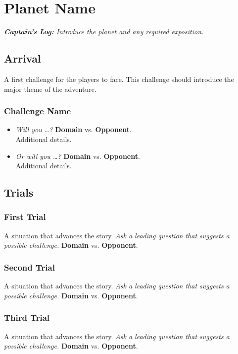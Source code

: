 \documentclass[11pt, a5paper, parskip=half-, DIV=12]{scrartcl}
\begin{document}
\section*{Planet Name}
\textit{\textbf{Captain's Log:} Introduce the planet and any required exposition.}

\subsection*{Arrival}
A first challenge for the players to face.  This challenge should introduce the major theme of the adventure.

\subsubsection*{Challenge Name}
\begin{itemize}
	\item \textit{Will you \dots?} \textbf{Domain} vs. \textbf{Opponent}. \\ Additional details.
	\item \textit{Or will you \ldots?} \textbf{Domain} vs. \textbf{Opponent}. \\ Additional details.  
\end{itemize}

\newpage

\subsection*{Trials}
\subsubsection*{First Trial}
A situation that advances the story. \textit{Ask a leading question that suggests a possible challenge.} \textbf{Domain} vs. \textbf{Opponent}.

\subsubsection*{Second Trial}
A situation that advances the story. \textit{Ask a leading question that suggests a possible challenge.} \textbf{Domain} vs. \textbf{Opponent}.

\subsubsection*{Third Trial}
A situation that advances the story. \textit{Ask a leading question that suggests a possible challenge.} \textbf{Domain} vs. \textbf{Opponent}.
\end{document}

